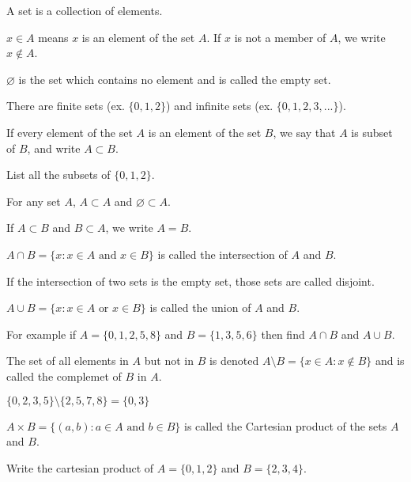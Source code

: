 \documentclass[../main.tex]{subfiles}
\begin{document}
A set is a collection of elements.

$x\in A$ means $x$ is an element of the set $A$.
If $x$ is not a member of $A$, we write $x\notin A$.

$\varnothing$ is the set which contains no element and is called the empty set.

There are finite sets (ex. $\{0,1,2\}$) and infinite sets (ex. $\{0,1,2,3,...\}$).

If every element of the set $A$ is an element of the set $B$, we say that $A$ is subset of $B$, and write $A\subset B$.
\begin{example}
  List all the subsets of $\{0,1,2\}$.
\end{example}

For any set $A$, $A\subset A$ and $\varnothing \subset A$.

If $A\subset B$ and $B\subset A$, we write $A=B$.

$A\cap B = \{x:x\in A \text{ and } x\in B\}$ is called the intersection of $A$ and $B$.
\begin{center}
\end{center}

If the intersection of two sets is the empty set, those sets are called disjoint.

$A\cup B=\{x:x\in A \text{ or } x\in B\}$ is called the union of $A$ and $B$.
\begin{center}
\end{center}

\begin{example}
For example if $A=\{0,1,2,5,8\}$ and $B=\{1,3,5,6\}$ then find $A\cap B$ and $A\cup B$.
\end{example}

The set of all elements in $A$ but not in $B$ is denoted $A\setminus B=\{x\in A:x\notin B\}$ and is called the complemet of $B$ in $A.$

\begin{example}
$\{0,2,3,5\}\setminus \{2,5,7,8\}=\{0,3\}$
\end{example}

$A\times B=\{(a,b):a\in A \text{ and } b\in B\}$ is called the Cartesian product of the sets $A$ and $B$.

\begin{example}
Write the cartesian product of $A=\{0,1,2\}$ and $B=\{2,3,4\}$.
\end{example}
\end{document}
